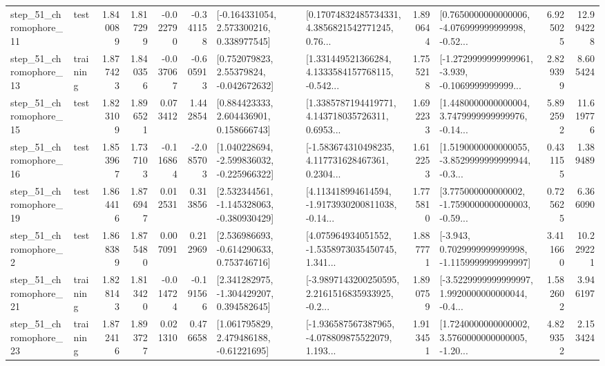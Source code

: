 \begin{tabular}{llrrrrllrlrr}
   step\_51\_chromophore\_11 &      test &      1.840089 &    1.817299 &     -0.022790 & -0.341158 &    [-0.164331054, 2.573300216, 0.338977545] &  [0.17074832485734331, 4.3856821542771245, 0.76... &       1.890644 &  [0.7650000000000006, -4.076999999999998, -0.52... &            6.925025 &         12.994228 \\
   step\_51\_chromophore\_13 &  training &      1.877423 &    1.840356 &     -0.037067 & -0.605913 &     [0.752079823, 2.55379824, -0.042672632] &  [1.331449521366284, 4.1333584157768115, -0.542... &       1.755218 &  [-1.2729999999999961, -3.939, -0.1069999999999... &            2.829399 &          8.605424 \\
   step\_51\_chromophore\_15 &      test &      1.823109 &    1.896521 &      0.073412 &  1.442854 &     [0.884423333, 2.604436901, 0.158666743] &  [1.3385787194419771, 4.143718035726311, 0.6953... &       1.692233 &  [1.4480000000000004, 3.7479999999999976, -0.14... &            5.892592 &         11.619776 \\
   step\_51\_chromophore\_16 &      test &      1.853967 &    1.737103 &     -0.116864 & -2.085703 &   [1.040228694, -2.599836032, -0.225966322] &  [-1.583674310498235, 4.117731628467361, 0.2304... &       1.612253 &  [1.5190000000000055, -3.8529999999999944, -0.3... &            0.431155 &          1.389489 \\
   step\_51\_chromophore\_19 &      test &      1.864416 &    1.876947 &      0.012531 &  0.313856 &   [2.532344561, -1.145328063, -0.380930429] &  [4.113418994614594, -1.9173930200811038, -0.14... &       1.775810 &  [3.775000000000002, -1.7590000000000003, -0.59... &            0.725625 &          6.366090 \\
    step\_51\_chromophore\_2 &      test &      1.868389 &    1.875480 &      0.007091 &  0.212969 &    [2.536986693, -0.614290633, 0.753746716] &  [4.075964934051552, -1.5358973035450745, 1.341... &       1.887771 &  [-3.943, 0.7029999999999998, -1.1159999999999997] &            3.411660 &         10.229221 \\
   step\_51\_chromophore\_21 &  training &      1.828143 &    1.813420 &     -0.014724 & -0.191566 &    [2.341282975, -1.304429207, 0.394582645] &  [-3.9897143200250595, 2.2161516835933925, -0.2... &       1.890759 &  [-3.5229999999999997, 1.9920000000000044, -0.4... &            1.582602 &          3.946197 \\
   step\_51\_chromophore\_23 &  training &      1.872416 &    1.893727 &      0.021310 &  0.476658 &     [1.061795829, 2.479486188, -0.61221695] &  [-1.936587567387965, -4.078809875522079, 1.193... &       1.913451 &  [1.7240000000000002, 3.5760000000000005, -1.20... &            4.829352 &          2.153424 \\

\end{tabular}
